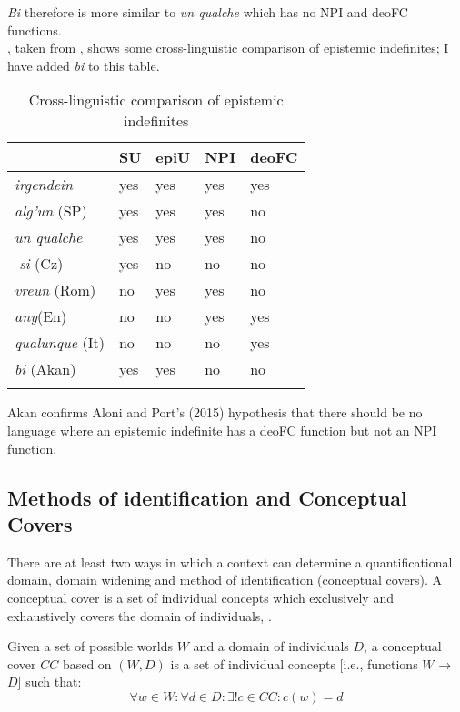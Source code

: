 \documentclass[output=paper,modfonts,nonflat,draftmode]{langsci/langscibook}
\begin{document}
\emph{Bi} therefore is more similar to \emph{un qualche} which has no NPI and deoFC functions. \\
 , taken from \citet{AloniPort2015}, shows some cross-linguistic comparison of epistemic indefinites; I have added \emph{bi} to this table.\\

\begin{table}
\caption{Cross-linguistic comparison of epistemic indefinites}
	\begin{tabularx}{.8\textwidth}{lXXXX}
		\lsptoprule
		{}		& SU		& 	epiU & NPI & deoFC \\ 
		\midrule 
		\emph{irgendein} 			& yes 		& 	yes	& 	yes	& 	yes	\\ 
		\emph{alg'un} (SP)        & yes 	 	& 	yes 	& 	yes & 	no		\\ 
		 \emph{un qualche} 		& yes 	 	& 	yes 	& 	yes & 	no \\		
		-\emph{si} (Cz)	& 	yes	& 	no &	 no & no			\\ 
		\emph{vreun} (Rom) 		& no	 	& 	yes 	& 	yes & 	no \\			
		\emph{any}(En) 		& no 	 	& 	no 	& 	yes & 	yes \\			
		\emph{qualunque} (It)		& no	 	& 	no 	& 	no & 	yes \\		
		\emph{bi} (Akan) 		& yes 	 	& 	yes 	& 	no & 	no \\		
		\lspbottomrule
	\end{tabularx}
	\label{tab:owusu:1}
    \end{table}
    
Akan confirms Aloni and Port's (2015) hypothesis that there should be no language where an epistemic indefinite has a deoFC function but not an NPI function. 

\subsection{Methods of identification and Conceptual Covers}
There are at least two ways in which a context can determine a quantificational domain, domain widening and method of identification (conceptual covers). 
A conceptual cover is a set of individual concepts which exclusively and exhaustively covers the domain of individuals, \citep{Aloni2001}.

\ea{} Given a set of possible worlds $W$ and a domain of individuals $D$, a conceptual cover $CC$ based on $(W, D)$ is a set of individual concepts [i.e., functions $W$ → $D$] such that: 
\[ \forall w \in W: \forall d \in D: \exists!c \in CC : c(w)=d \]
\z
\end{document}
